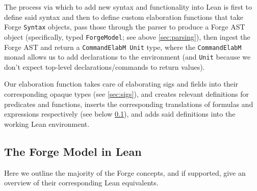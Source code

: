 The process via which to add new syntax and functionality into Lean is first to define said syntax and then to define custom elaboration functions that take Forge \texttt{Syntax} objects, pass those through the parser to produce a Forge AST object (specifically, typed \texttt{ForgeModel}; see above \cref{sec:parsing}), then ingest the Forge AST and return a \texttt{CommandElabM Unit} type, where the \texttt{CommandElabM} monad allows us to add declarations to the environment (and \texttt{Unit} because we don't expect top-level declarations/commands to return values). 

Our elaboration function takes care of elaborating sigs and fields into their corresponding opaque types (see \cref{sec:sigs}), and creates relevant definitions for predicates and functions, inserts the corresponding translations of formulas and expressions respectively (see below \cref{sec:forge-model}), and adds said definitions into the working Lean environment.

\subsection{The Forge Model in Lean}\label{sec:forge-model}
Here we outline the majority of the Forge concepts, and if supported, give an overview of their corresponding Lean equivalents. 


